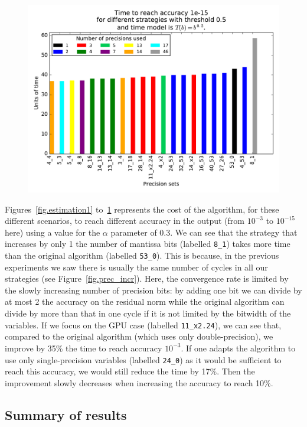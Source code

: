 \documentclass[10pt,conference]{IEEEtran}
\begin{document}
   \begin{figure}
    \includegraphics[width=\linewidth]{figs/cost_15.pdf}
    \caption{}
    \label{fig.estimation5}
   \end{figure}
   
   Figures~\ref{fig.estimation1} to~\ref{fig.estimation5} represents the cost of the algorithm, for these different scenarios, to reach different accuracy in the output (from $10^{-3}$ to $10^{-15}$ here) using
   a value for the $\alpha$ parameter of 0.3. We can see that the strategy that increases by only 1 the number of mantissa bits (labelled \texttt{8\_1}) takes more time than the original algorithm (labelled \texttt{53\_0}). This is because, in the previous experiments we saw
   there is usually the same number of cycles in all our strategies (see Figure~\ref{fig.prec_incr}). Here, the convergence rate is limited by the slowly increasing number of precision bits: by adding one bit we can divide by at most 2 the 
   accuracy on the residual norm while the original algorithm can divide by more than that in one cycle if it is not limited by the bitwidth of the variables.
   If we focus on the GPU case (labelled \texttt{11\_x2.24}), we can see that, compared to the original algorithm (which uses only double-precision), we improve by 35\% the time to reach 
   accuracy $10^{-3}$. If one adapts the algorithm to use only single-precision variables (labelled \texttt{24\_0}) as it would be sufficient to reach this accuracy, we would still reduce the time by 17\%. Then the improvement slowly decreases when increasing the accuracy to reach 10\%.
   
   \subsection{Summary of results}
   
\end{document}
